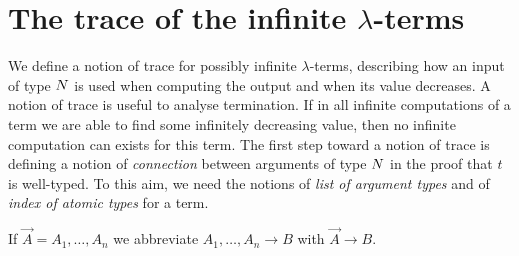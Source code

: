
\section{The trace of the infinite $\lambda$-terms}
We define a notion of trace for possibly infinite $\lambda$-terms, 
describing how an input of type ${N}$ is used when computing the output
and when its value decreases. A notion of trace is useful to analyse termination.
If in all infinite computations of a term we are able to find some infinitely
decreasing value, then no infinite computation can exists for this term. 
The first step toward a notion of  trace is defining a notion of \emph{connection} 
between arguments of type ${N}$ in the proof that $t$ is well-typed. 
To this aim, we need the notions of \emph{list of argument
 types} and of \emph{index of atomic types} for a term.

%
%

If $\vec{A} = A_1, \ldots, A_n$ we abbreviate 
$A_1, \ldots, A_n \rightarrow B$ with $\vec{A} \rightarrow B$.

